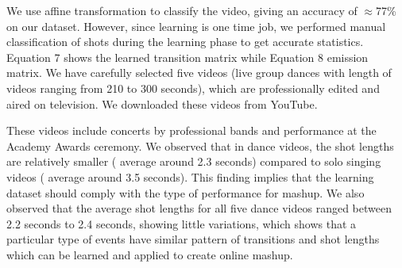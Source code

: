 \documentclass{new}
\begin{document}
We use affine transformation to classify the video, giving an accuracy
of $\approx $77\% on our dataset. However, since learning is one
time job, we performed manual classification of shots during the
learning phase to get accurate statistics. Equation 7 shows the
learned transition matrix while Equation 8 emission matrix. We
have carefully selected five videos (live group dances with length
of videos ranging from 210 to 300 seconds), which are professionally
edited and aired on television. We downloaded these videos
from YouTube.

These videos include concerts by professional bands and performance
at the Academy Awards ceremony. We observed that
in dance videos, the shot lengths are relatively smaller ( average
around 2.3 seconds) compared to solo singing videos ( average
around 3.5 seconds). This finding implies that the learning dataset
should comply with the type of performance for mashup. We also
observed that the average shot lengths for all five dance videos
ranged between 2.2 seconds to 2.4 seconds, showing little variations,
which shows that a particular type of events have similar
pattern of transitions and shot lengths which can be learned and
applied to create online mashup.
\end{document}
